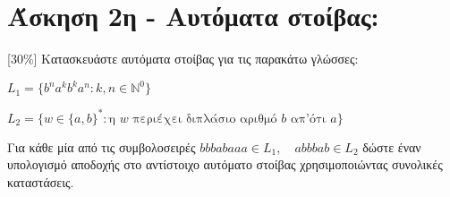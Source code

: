 \section{Άσκηση 2η - Αυτόματα στοίβας:}
\label{sec:Exercise_2}
\doublespacing

[30\%] Κατασκευάστε αυτόματα στοίβας για τις παρακάτω γλώσσες:

\bm{\textcolor{blue}{(α)}} $L_1 = \{b^n a^k b^k a^n : k, n \in  \mathbb{N}^0 \}$

\bm{\textcolor{blue}{(β)}} $L_2 = \{w \in \{a, b\}^* :  \text{η } w \text{ περιέχει διπλάσιο αριθμό } b
\text{ απ'ότι } a\}$

Για κάθε μία από τις συμβολοσειρές $bbbabaaa \in L_1,\quad abbbab \in L_2$ δώστε έναν υπολογισμό αποδοχής στο
αντίστοιχο αυτόματο στοίβας χρησιμοποιώντας συνολικές καταστάσεις.
\clearpage